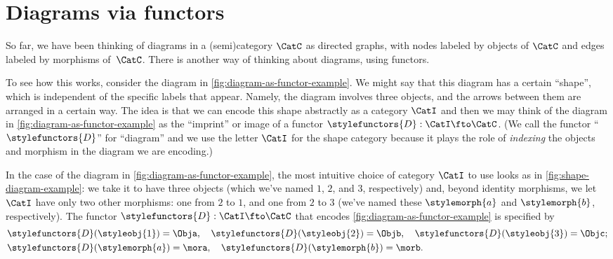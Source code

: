 
\section{Diagrams via functors}


So far, we have been thinking of diagrams in a (semi)category $\CatC$ as directed graphs, with nodes labeled by objects of $\CatC$ and edges labeled by morphisms of~$\CatC$.
There is another way of thinking about diagrams, using functors.

To see how this works, consider the diagram in \cref{fig:diagram-as-functor-example}.
We might say that this diagram has a certain ``shape'', which is independent of the specific labels that appear.
Namely, the diagram involves three objects, and the arrows between them are arranged in a certain way.
The idea is that we can encode this shape abstractly as a category $\CatI$ and then we may think of the diagram in \cref{fig:diagram-as-functor-example} as the ``imprint'' or image of a functor $\stylefunctors{D}: \CatI \fto \CatC$.
(We call the functor ``$\stylefunctors{D}$'' for ``diagram'' and we use the letter $\CatI$ for the shape category because it plays the role of \emph{indexing} the objects and morphism in the diagram we are encoding.)

\begin{marginfigure}
	\centering
	\caption{}
	\label{fig:diagram-as-functor-example}
\end{marginfigure}

\begin{marginfigure}
	\centering
	\caption{}
	\label{fig:shape-diagram-example}
\end{marginfigure}

In the case of the diagram in \cref{fig:diagram-as-functor-example}, the most intuitive choice of category $\CatI$ to use looks as in \cref{fig:shape-diagram-example}: we take it to have three objects (which we've named $1$, $2$, and $3$, respectively) and, beyond identity morphisms, we let $\CatI$ have only two other morphisms: one from $2$ to $1$, and one from $2$ to $3$ (we've named these $\stylemorph{a}$ and $\stylemorph{b}$, respectively).
The functor $\stylefunctors{D}: \CatI \fto \CatC$ that encodes \cref{fig:diagram-as-functor-example} is specified by
\begin{align*}
	 & \stylefunctors{D}(\styleobj{1}) = \Obja, \quad \stylefunctors{D}(\styleobj{2}) = \Objb, \quad  \stylefunctors{D}(\styleobj{3}) = \Objc; \\
	 & \stylefunctors{D}(\stylemorph{a}) = \mora, \quad \stylefunctors{D}(\stylemorph{b}) = \morb.
\end{align*}

